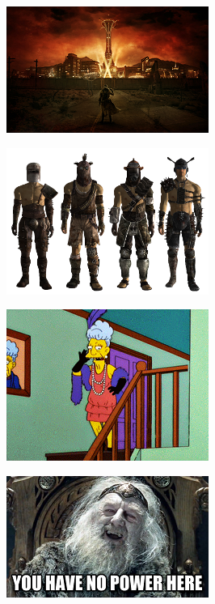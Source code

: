 \begin{figure}
	\begin{center}
		\includegraphics[width=\figwidth]{pics/6/13.png}
	\end{center}
\end{figure}

\begin{figure}
	\begin{center}
		\includegraphics[width=\figwidth]{pics/6/14.png}
	\end{center}
\end{figure}

\begin{figure}
	\begin{center}
		\includegraphics[width=\figwidth]{pics/6/15.png}
	\end{center}
\end{figure}

\begin{figure}
	\begin{center}
		\includegraphics[width=\figwidth]{pics/6/16.png}
	\end{center}
\end{figure}


